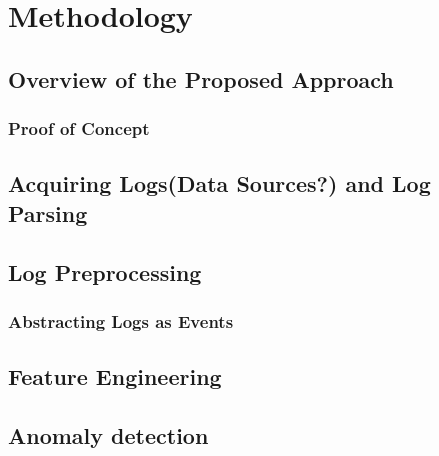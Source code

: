 \chapter{Methodology}
\section{Overview of the Proposed Approach}
\subsection{Proof of Concept}

\section{Acquiring Logs(Data Sources?) and Log Parsing}

\section{Log Preprocessing}
\subsection{Abstracting Logs as Events}

\section{Feature Engineering}

\section{Anomaly detection}
